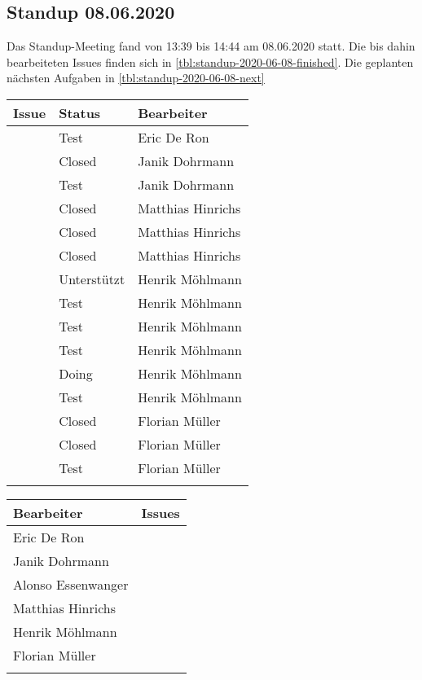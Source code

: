 	\subsection{Standup 08.06.2020}
	Das Standup-Meeting fand von 13:39 bis 14:44 am 08.06.2020 statt. Die bis dahin bearbeiteten Issues finden sich in \autoref{tbl:standup-2020-06-08-finished}. Die geplanten nächsten Aufgaben in \autoref{tbl:standup-2020-06-08-next}
		\begin{tabularx}{0.75\textwidth}{c|X|X}
			Issue & Status & Bearbeiter\\
			\hline
			\issueref{74}	& Test	& Eric De Ron\\
			\issueref{71}	& Closed	& Janik Dohrmann\\
			\issueref{77}	& Test		& Janik Dohrmann\\
			\issueref{70}	& Closed	& Matthias Hinrichs\\
			\issueref{74}	& Closed	& Matthias Hinrichs\\
			\issueref{73}	& Closed	& Matthias Hinrichs\\
			\issueref{77}	& Unterstützt	& Henrik Möhlmann\\
			\issueref{69}	& Test			& Henrik Möhlmann\\
			\issueref{70}	& Test			& Henrik Möhlmann\\
			\issueref{76}	& Test			& Henrik Möhlmann\\
			\issueref{68}	& Doing			& Henrik Möhlmann\\
			\issueref{73}	& Test			& Henrik Möhlmann\\
			\issueref{77}	& Closed		& Florian Müller\\
			\issueref{76}	& Closed		& Florian Müller\\
			\issueref{71}	& Test			& Florian Müller\\
			\hline
			\caption{bearbeitete Issues}
			\label{tbl:standup-2020-06-08-finished}
		\end{tabularx}
	\newpage
		\begin{tabularx}{0.75\textwidth}{X|X}
			Bearbeiter & Issues\\
			\hline
			Eric De Ron			& \\
			Janik Dohrmann		& \issueref{65}\\
			Alonso Essenwanger	& \issueref{72}\\
			Matthias Hinrichs	& \\
			Henrik Möhlmann		& \\
			Florian Müller		& \issueref{56}\\
			\hline
			\caption{nächste Aufgaben}
			\label{tbl:standup-2020-06-08-next}
		\end{tabularx}